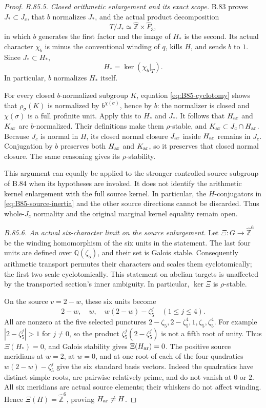 \begin{proof}
\emph{B.85.5. Closed arithmetic enlargement and its exact scope.}
B.83 proves $J_*\subset J_c$, that $b$ normalizes $J_*$, and the actual
product decomposition
\[
 T/J_*\simeq\widehat{\mathbb Z}\times\widehat F_3,
\]
in which $b$ generates the first factor and the image of $H_*$ is the
second. Its actual character $\chi_b$ is minus the conventional winding
of $q$, kills $H$, and sends $b$ to $1$. Since $J_*\subset H_*$,
\[
 H_*=\ker(\chi_b|_T).
\]
In particular, $b$ normalizes $H_*$ itself.

For every closed $b$-normalized subgroup $K$, equation
\eqref{eq:B85-cyclotomy} shows that $\rho_\sigma(K)$ is normalized by
$b^{\chi(\sigma)}$, hence by $b$: the normalizer is closed and
$\chi(\sigma)$ is a full profinite unit. Apply this to $H_*$ and $J_*$.
It follows that $H_{\rm ar}$ and $K_{\rm ar}$ are $b$-normalized.
Their definitions make them $\rho$-stable, and $K_{\rm ar}\subset
J_c\cap H_{\rm ar}$. Because $J_c$ is normal in $H$, its closed normal
closure $J_{\rm ar}$ inside $H_{\rm ar}$ remains in $J_c$. Conjugation
by $b$ preserves both $H_{\rm ar}$ and $K_{\rm ar}$, so it preserves
that closed normal closure. The same reasoning gives its $\rho$-stability.

This argument can equally be applied to the stronger controlled source
subgroup of B.84 when its hypotheses are invoked. It does not identify
the arithmetic kernel enlargement with the full source kernel. In
particular, the $H$-conjugators in \eqref{eq:B85-source-inertia} and the
other source directions cannot be discarded. Thus whole-$J_c$
normality and the original marginal kernel equality remain open.

\emph{B.85.6. An actual six-character limit on the source enlargement.}
Let $\Xi:G\to\widehat{\mathbb Z}^{6}$ be the winding homomorphism
of the six units in the statement. The last four units are defined over
$\mathbb Q(\zeta_5)$, and their set is Galois stable. Consequently
arithmetic transport permutes their characters and scales them
cyclotomically; the first two scale cyclotomically. This statement on
abelian targets is unaffected by the transported section's inner
ambiguity. In particular, $\ker\Xi$ is $\rho$-stable.

On the source $v=2-w$, these six units become
\[
 2-w,\quad w,\quad w(2-w)-\zeta_5^j\quad(1\leq j\leq4).
\]
All are nonzero at the five selected punctures
$2-\zeta_5,2-\zeta_5^4,1,\zeta_5,\zeta_5^4$.
For example $|2-\zeta_5^j|>1$ for $j\ne0$, so the product
$\zeta_5^j(2-\zeta_5^j)$ is not a fifth root of unity.
Thus $\Xi(H_*)=0$, and Galois stability gives $\Xi(H_{\rm ar})=0$.
The positive source meridians at $w=2$, at $w=0$, and at one root of
each of the four quadratics $w(2-w)-\zeta_5^j$ give the six standard
basis vectors. Indeed the quadratics have distinct simple roots, are
pairwise relatively prime, and do not vanish at $0$ or $2$.
All six meridians are actual source elements; their whiskers do not
affect winding. Hence $\Xi(H)=\widehat{\mathbb Z}^{6}$, proving
$H_{\rm ar}\ne H$.


\end{proof}
